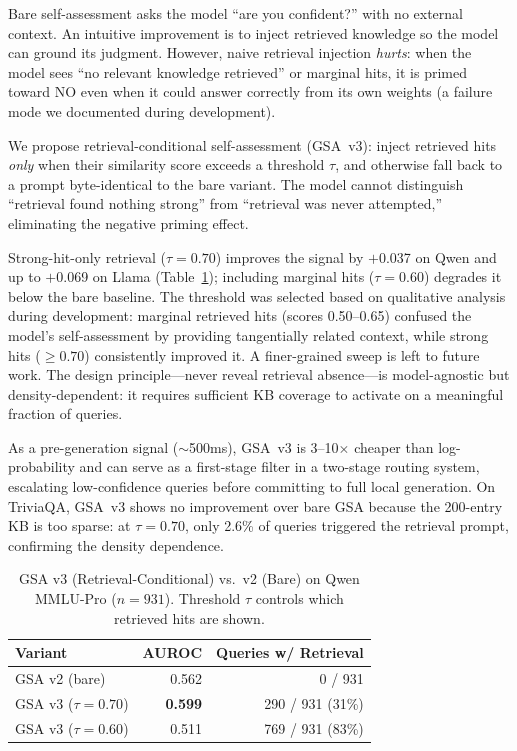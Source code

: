 \documentclass[journal]{IEEEtran}
\begin{document}
Bare self-assessment asks the model ``are you confident?'' with no external context. An intuitive improvement is to inject retrieved knowledge so the model can ground its judgment. However, naive retrieval injection \emph{hurts}: when the model sees ``no relevant knowledge retrieved'' or marginal hits, it is primed toward NO even when it could answer correctly from its own weights (a failure mode we documented during development).

We propose retrieval-conditional self-assessment (GSA~v3): inject retrieved hits \emph{only} when their similarity score exceeds a threshold $\tau$, and otherwise fall back to a prompt byte-identical to the bare variant. The model cannot distinguish ``retrieval found nothing strong'' from ``retrieval was never attempted,'' eliminating the negative priming effect.

Strong-hit-only retrieval ($\tau{=}0.70$) improves the signal by $+$0.037 on Qwen and up to $+$0.069 on Llama (Table~\ref{tab:gsa}); including marginal hits ($\tau{=}0.60$) degrades it below the bare baseline. The threshold was selected based on qualitative analysis during development: marginal retrieved hits (scores 0.50--0.65) confused the model's self-assessment by providing tangentially related context, while strong hits (${\geq}0.70$) consistently improved it. A finer-grained sweep is left to future work. The design principle---never reveal retrieval absence---is model-agnostic but density-dependent: it requires sufficient KB coverage to activate on a meaningful fraction of queries.

As a pre-generation signal (${\sim}$500ms), GSA~v3 is 3--10$\times$ cheaper than log-probability and can serve as a first-stage filter in a two-stage routing system, escalating low-confidence queries before committing to full local generation. On TriviaQA, GSA~v3 shows no improvement over bare GSA because the 200-entry KB is too sparse: at $\tau{=}0.70$, only 2.6\% of queries triggered the retrieval prompt, confirming the density dependence.

\begin{table}[t]
\centering
\caption{GSA v3 (Retrieval-Conditional) vs.\ v2 (Bare) on Qwen MMLU-Pro ($n{=}931$). Threshold $\tau$ controls which retrieved hits are shown.}
\label{tab:gsa}
\begin{tabular}{lrr}
\toprule
Variant & AUROC & Queries w/ Retrieval \\
\midrule
GSA v2 (bare) & 0.562 & 0 / 931 \\
GSA v3 ($\tau{=}0.70$) & \textbf{0.599} & 290 / 931 (31\%) \\
GSA v3 ($\tau{=}0.60$) & 0.511 & 769 / 931 (83\%) \\
\bottomrule
\end{tabular}
\end{table}
\end{document}

